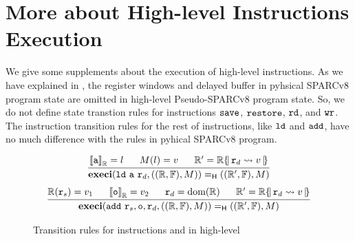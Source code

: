 \section{More about High-level Instructions Execution}
\label{appendix:more-about-high-level-insExec}

We give some supplements about the execution of high-level instructions. 
As we have explained in \Sec{\ref{subsec:High-level Pseudo-SPARCv8 Language}}, 
the register windows and delayed buffer in pyhsical SPARCv8 program state 
are omitted in high-level Pseudo-SPARCv8 program state. So, we do not define  
state transtion rules for instructions $\texttt{save}{}$, $\texttt{restore}{}$, $\texttt{rd}{}$, 
and $\texttt{wr}{}$. The instruction transition rules for the rest of instructions, like  
$\texttt{ld}{}$ and $\texttt{add}{}$, have no much difference with the rules in pyhical SPARCv8 program. 
\begin{figure}[!h]
    \centering
    \[
        \begin{array}{c}
            \infer
            {
                \hexeci{(\ld \ \aexp \ \reg{d}, ((\hRfile, \hWstk), \Mem))}
                    {((\hRfile', \hWstk), \Mem)}
            }
            {
                \evalR{\aexp}{\hRfile} = \loc \quad \ \ 
                \Mem(\loc) = \val \quad \ \ 
                \hRfile' = \hRfile\hRegUpd{ \reg{d} \rightsquigarrow \val } 
            } \\
            \\[-5pt]
            \infer
            {
                \hexeci{(\cadd \ \reg{s}, \oexp, \reg{d}, ((\hRfile, \hWstk), \Mem))}
                    {((\hRfile', \hWstk), \Mem)}
            }
            {
                \hRfile(\reg{s}) = \val_1 \quad \ \ 
                \evalR{\oexp}{\hRfile} = \val_2 \quad \ \ 
                \reg{d} = \dom(\hRfile) \quad \ \ 
                \hRfile' = \hRfile\hRegUpd{ \reg{d} \rightsquigarrow \val }
            }
        \end{array}
    \]
    \caption{Transition rules for instructions \ld{} and \cadd{} in high-level}
    \label{fig:Transition rules for instructions ld and add in high-level}
\end{figure}

